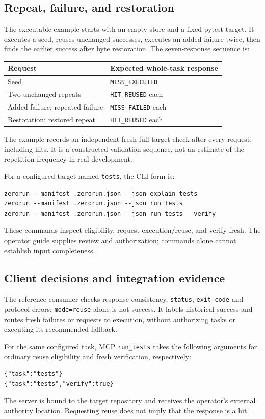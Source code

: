 \documentclass[preprint,12pt,a4paper]{elsarticle}
\newcommand{\code}[1]{\texttt{#1}}
\begin{document}
\subsection{Repeat, failure, and restoration}
The executable example starts with an empty store and a fixed pytest target. It executes a seed, reuses unchanged successes, executes an added failure twice, then finds the earlier success after byte restoration. The seven-response sequence is:
\begin{center}
\small
\begin{tabular}{ll}
\toprule
Request & Expected whole-task response \\
\midrule
Seed & \code{MISS\_EXECUTED} \\
Two unchanged repeats & \code{HIT\_REUSED} each \\
Added failure; repeated failure & \code{MISS\_FAILED} each \\
Restoration; restored repeat & \code{HIT\_REUSED} each \\
\bottomrule
\end{tabular}
\end{center}
The example records an independent fresh full-target check after every request, including hits. It is a constructed validation sequence, not an estimate of the repetition frequency in real development.

For a configured target named \code{tests}, the CLI form is:
\begin{verbatim}
zerorun --manifest .zerorun.json --json explain tests
zerorun --manifest .zerorun.json --json run tests
zerorun --manifest .zerorun.json --json run tests --verify
\end{verbatim}
These commands inspect eligibility, request execution/reuse, and verify fresh. The operator guide supplies review and authorization; commands alone cannot establish input completeness.

\subsection{Client decisions and integration evidence}
The reference consumer checks response consistency, \code{status}, \code{exit\_code} and protocol errors; \code{mode=reuse} alone is not success. It labels historical success and routes fresh failures or requests to execution, without authorizing tasks or executing its recommended fallback.

For the same configured task, MCP \code{run\_tests} takes the following arguments for ordinary reuse eligibility and fresh verification, respectively:
\begin{verbatim}
{"task":"tests"}
{"task":"tests","verify":true}
\end{verbatim}
The server is bound to the target repository and receives the operator's external authority location. Requesting reuse does not imply that the response is a hit.
\end{document}
